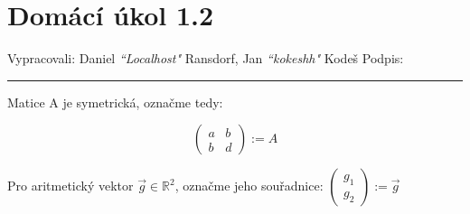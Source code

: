 \documentclass[12pt]{article}
\begin{document}
\section*{Domácí úkol 1.2}

Vypracovali: Daniel \textit{``Localhost"} Ransdorf, Jan \textit{``kokeshh"} Kodeš \hfill Podpis: \rule{4cm}{0.4pt}

\bigskip

Matice A je symetrická, označme tedy:

\[
  \left( \begin{array}{cc} a&b\\b&d \end{array} \right) := A
\]

Pro aritmetický vektor $\vec{g} \in \mathbb{R}^2$, označme jeho souřadnice: $\left(\begin{array}{c} g_1 \\ g_2 \end{array}\right) := \vec{g}$
\end{document}
